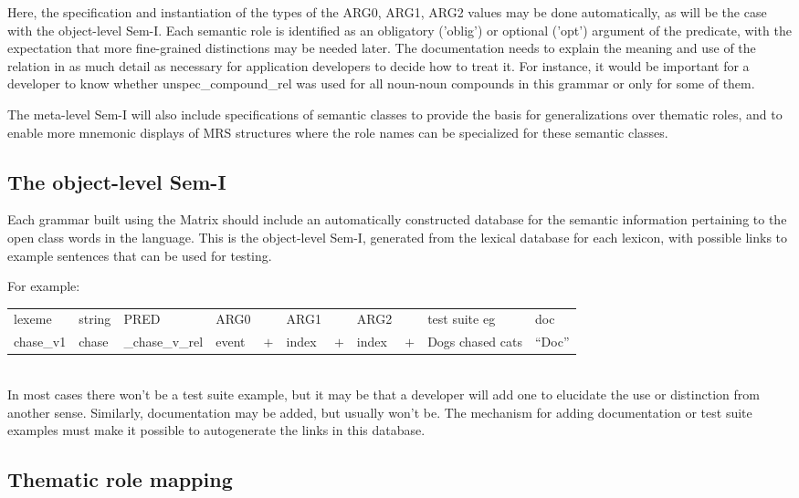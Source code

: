 \documentclass[12pt]{article}
\begin{document}
Here, the specification and instantiation of the types
of the ARG0, ARG1, ARG2 values may be done automatically, as will be the case
with the object-level Sem-I.  Each semantic role is identified as an
obligatory ('oblig') or optional ('opt') argument of the predicate, with the 
expectation that more fine-grained distinctions may be needed later.
The documentation needs to explain the meaning and use
of the relation in as much detail as necessary for application
developers to decide how to treat it.  For instance, it would be 
important for a developer
to know whether unspec\_compound\_rel was used for all 
noun-noun compounds in this grammar or only for some of them.

The meta-level Sem-I will also include specifications of semantic classes
to provide the basis for generalizations over thematic roles, and to enable
more mnemonic displays of MRS structures where the role names can be
specialized for these semantic classes.

\subsection{The object-level Sem-I}

Each grammar built using the Matrix should include an automatically 
constructed database for the semantic information pertaining to the open class 
words in the language.  This is the object-level Sem-I, generated from the 
lexical database for each lexicon, with possible links to example sentences
that can be used for testing.

For example:\\

\noindent
{\small
\begin{tabular}{lllllllllll}
lexeme & string & PRED & ARG0 & & ARG1 & & ARG2 & & test suite eg & doc\\
chase\_v1 & chase & \_chase\_v\_rel & event & $+$ & index & $+$ & index & $+$ & Dogs chased cats & ``Doc''
\end{tabular}
}\\

In most cases there won't be a test suite example, but it may be that a
developer will add one to elucidate the use or distinction from another sense. 
Similarly, documentation may be added, but usually won't be.
The mechanism for adding documentation or test suite examples
must make it possible to autogenerate the links in this database.


\subsection{Thematic role mapping}
\end{document}
